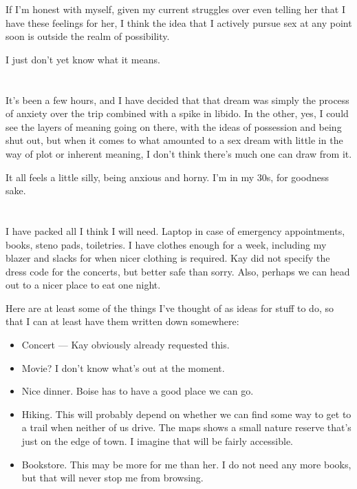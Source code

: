 If I'm honest with myself, given my current struggles over even telling her that I have these feelings for her, I think the idea that I actively pursue sex at any point soon is outside the realm of possibility.

I just don't yet know what it means.

\section{}

It's been a few hours, and I have decided that that dream was simply the process of anxiety over the trip combined with a spike in libido. In the other, yes, I could see the layers of meaning going on there, with the ideas of possession and being shut out, but when it comes to what amounted to a sex dream with little in the way of plot or inherent meaning, I don't think there's much one can draw from it.

It all feels a little silly, being anxious and horny. I'm in my 30s, for goodness sake.

\section{}

I have packed all I think I will need. Laptop in case of emergency appointments, books, steno pads, toiletries. I have clothes enough for a week, including my blazer and slacks for when nicer clothing is required. Kay did not specify the dress code for the concerts, but better safe than sorry. Also, perhaps we can head out to a nicer place to eat one night.

Here are at least some of the things I've thought of as ideas for stuff to do, so that I can at least have them written down somewhere:

\begin{itemize}
\tightlist
\item
  Concert --- Kay obviously already requested this.
\item
  Movie? I don't know what's out at the moment.
\item
  Nice dinner. Boise has to have a good place we can go.
\item
  Hiking. This will probably depend on whether we can find some way to get to a trail when neither of us drive. The maps shows a small nature reserve that's just on the edge of town. I imagine that will be fairly accessible.
\item
  Bookstore. This may be more for me than her. I do not need any more books, but that will never stop me from browsing.
\end{itemize}

